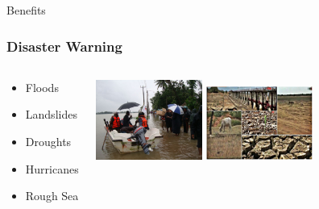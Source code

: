 \documentclass[serif,mathserif]{beamer}
\begin{document}

\begin{frame}
  \begin{center}
  \Huge{Benefits}
  \end{center}
\end{frame}


\begin{frame}
  \frametitle{Disaster Warning}
\begin{columns}
\begin{center}
\Large{
\begin{itemize}
 \item Floods
 \item Landslides
 \item Droughts
 \item Hurricanes
 \item Rough Sea
\end{itemize}
}
\end{center}

\begin{center}
 \includegraphics[width=3.5cm]{floods1}
 \vspace{1mm}
 \includegraphics[width=3.5cm]{Drought-hits-North-of-Sri-Lanka-}
\end{center}
\end{columns}
\end{frame}
\end{document}
